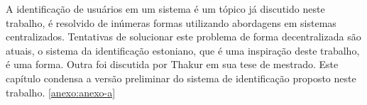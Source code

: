 \documentclass[tcc,capa]{texufpel}
\begin{document}
    A identificação de usuários em um sistema é um tópico já discutido neste trabalho, é resolvido de inúmeras formas utilizando abordagens em sistemas centralizados. Tentativas de solucionar este problema de forma decentralizada são atuais, o sistema da identificação estoniano, que é uma inspiração deste trabalho, é uma forma. Outra foi discutida por Thakur em sua tese de mestrado. Este capítulo condensa a versão preliminar do sistema de identificação proposto neste trabalho. \ref{anexo:anexo-a}










 

%

\annex

\end{document}
